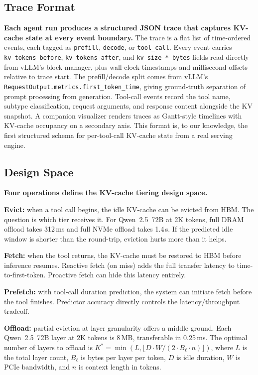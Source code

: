 \documentclass[10pt,twocolumn]{article}
\begin{document}
\subsection{Trace Format}

\textbf{Each agent run produces a structured JSON trace that captures KV-cache state at every event boundary.} The trace is a flat list of time-ordered events, each tagged as \texttt{prefill}, \texttt{decode}, or \texttt{tool\_call}. Every event carries \texttt{kv\_tokens\_before}, \texttt{kv\_tokens\_after}, and \texttt{kv\_size\_*\_bytes} fields read directly from vLLM's block manager, plus wall-clock timestamps and millisecond offsets relative to trace start. The prefill/decode split comes from vLLM's \texttt{RequestOutput.metrics.first\_token\_time}, giving ground-truth separation of prompt processing from generation. Tool-call events record the tool name, subtype classification, request arguments, and response content alongside the KV snapshot. A companion visualizer renders traces as Gantt-style timelines with KV-cache occupancy on a secondary axis. This format is, to our knowledge, the first structured schema for per-tool-call KV-cache state from a real serving engine.

\subsection{Design Space}

\textbf{Four operations define the KV-cache tiering design space.}

\textbf{Evict:} when a tool call begins, the idle KV-cache can be evicted from HBM. The question is which tier receives it. For Qwen~2.5~72B at 2K tokens, full DRAM offload takes 312\,ms and full NVMe offload takes 1.4\,s. If the predicted idle window is shorter than the round-trip, eviction hurts more than it helps.

\textbf{Fetch:} when the tool returns, the KV-cache must be restored to HBM before inference resumes. Reactive fetch (on miss) adds the full transfer latency to time-to-first-token. Proactive fetch can hide this latency entirely.

\textbf{Prefetch:} with tool-call duration prediction, the system can initiate fetch before the tool finishes. Predictor accuracy directly controls the latency/throughput tradeoff.

\textbf{Offload:} partial eviction at layer granularity offers a middle ground. Each Qwen~2.5~72B layer at 2K tokens is 8\,MB, transferable in 0.25\,ms. The optimal number of layers to offload is $K^* = \min(L, \lfloor D \cdot W / (2 \cdot B_\ell \cdot n) \rfloor)$, where $L$ is the total layer count, $B_\ell$ is bytes per layer per token, $D$ is idle duration, $W$ is PCIe bandwidth, and $n$ is context length in tokens.
\end{document}

